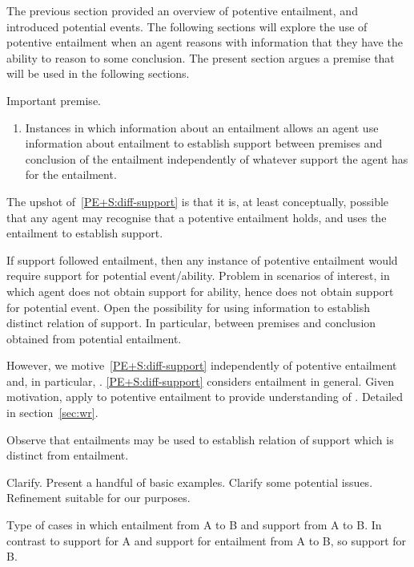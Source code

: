\begin{note}[Structure]
    The previous section provided an overview of potentive entailment, and introduced potential events.
  The following sections will explore the use of potentive entailment when an agent reasons with information that they have the ability to reason to some conclusion.
  The present section argues a premise that will be used in the following sections.

  Important premise.
  \begin{enumerate}
  \item\label{PE+S:diff-support} Instances in which information about an entailment allows an agent use information about entailment to establish support between premises and conclusion of the entailment independently of whatever support the agent has for the entailment.
  \end{enumerate}

  The upshot of~\ref{PE+S:diff-support} is that it is, at least conceptually, possible that any agent may recognise that a potentive entailment holds, and uses the entailment to establish support.

  If support followed entailment, then any instance of potentive entailment would require support for potential event/ability.
  Problem in scenarios of interest, in which agent does not obtain support for ability, hence does not obtain support for potential event.
  Open the possibility for using information to establish distinct relation of support.
  In particular, between premises and conclusion obtained from potential entailment.

  However, we motive~\ref{PE+S:diff-support} independently of potentive entailment and, in particular, \WR{}.
  \ref{PE+S:diff-support} considers entailment in general.
  Given motivation, apply to potentive entailment to provide understanding of \WR{}.
  Detailed in section~\ref{sec:wr}.
\end{note}

\begin{note}[Overview]
  Observe that entailments may be used to establish relation of support which is distinct from entailment.

  Clarify.
  Present a handful of basic examples.
  Clarify some potential issues.
  Refinement suitable for our purposes.
\end{note}

\begin{note}
  Type of cases in which entailment from A to B and support from A to B.
  In contrast to support for A and support for entailment from A to B, so support for B.
\end{note}

